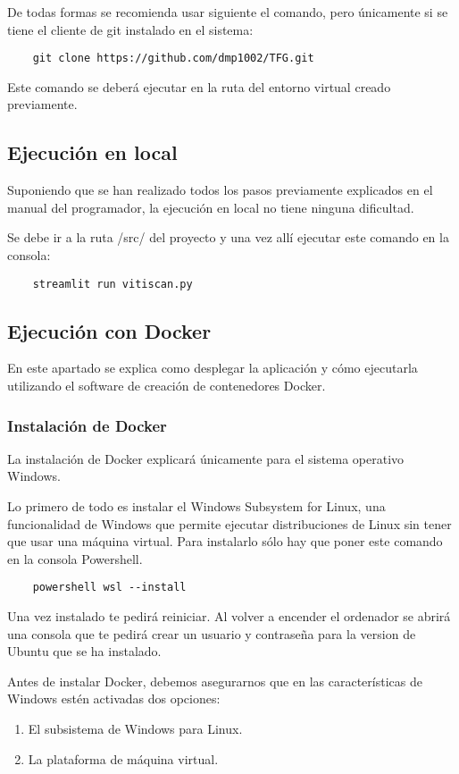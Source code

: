 De todas formas se recomienda usar siguiente el comando, pero únicamente si se tiene el cliente de git instalado en el sistema:
\begin{verbatim}
    git clone https://github.com/dmp1002/TFG.git
\end{verbatim}
Este comando se deberá ejecutar en la ruta del entorno virtual creado previamente.

\subsection{Ejecución en local}
Suponiendo que se han realizado todos los pasos previamente explicados en el manual del programador, la ejecución en local no tiene ninguna dificultad.

Se debe ir a la ruta /src/ del proyecto y una vez allí ejecutar este comando en la consola:
\begin{verbatim}
    streamlit run vitiscan.py
\end{verbatim}

\subsection{Ejecución con Docker}
En este apartado se explica como desplegar la aplicación y cómo ejecutarla utilizando el software de creación de contenedores Docker.

\subsubsection{Instalación de Docker}
La instalación de Docker explicará únicamente para el sistema operativo Windows.

Lo primero de todo es instalar el Windows Subsystem for Linux, una funcionalidad de Windows que permite ejecutar distribuciones de Linux sin tener que usar una máquina virtual. Para instalarlo sólo hay que poner este comando en la consola Powershell.
\begin{verbatim}
    powershell wsl --install
\end{verbatim}

Una vez instalado te pedirá reiniciar. Al volver a encender el ordenador se abrirá una consola que te pedirá crear un usuario y contraseña para la version de Ubuntu que se ha instalado.

Antes de instalar Docker, debemos asegurarnos que en las características de Windows estén activadas dos opciones:
\begin{enumerate}
    \item El subsistema de Windows para Linux.
    \item La plataforma de máquina virtual.
\end{enumerate}


